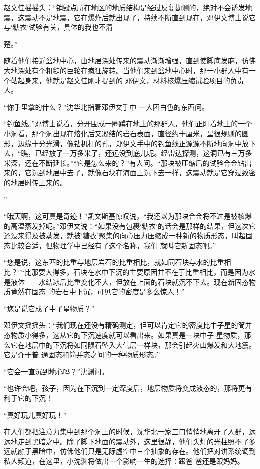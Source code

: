 \documentclass{article}
\begin{document}
赵文佳摇摇头：“销毁点所在地区的地质结构是经过反复勘测的，绝对不会诱发地震，这震动不是地震，它在爆炸后就出现了，持续不断直到现在，邓伊文博士说它与‘糖衣’试验有关，具体的我也不清

\newpage
楚。” 

随着他们接近盆地中心，由地层深处传来的震动渐渐增强，直到使脚底发麻，仿佛大地深处有个粗糙的巨轮在疯狂旋转。当他们来到盆地中心时，那一小群人中有一个站起身来，他就是赵文佳刚才提到的
邓伊文，材料核爆压缩试验项目的负责人。 

“你手里拿的什么？”沈华北指着邓伊文手中
一大团白色的东西问。 

“钓鱼线。”邓博士说着，分开围成一圈蹲在地上的那群人，他们正盯着地上的一个小洞看，那个洞出现在熔化后又凝结的岩石表面，直径约十厘米，呈很规则的圆形，边缘十分光滑，像钻机打的孔，郑伊文手中的钓鱼线正源源不断地向洞中放下去，“瞧，已经放了一万多米了，还远没到底儿呢。经雷达探测，这洞已有三万多米深，还在不断延长。”“它是怎么来的？”有人问。“那块被压缩后的试验合金钻出来的，它沉到地层中去了，就像石块在海面上沉下去一样，这震动就是它穿过致密的地层时传上来的。

\newpage
” 

“哦天啊，这可真是奇迹！”凯文斯基惊叹说，“我还以为那块合金将不过是被核爆的高温蒸发掉呢。”邓伊文说：“如果没有包裹‘糖衣’的话会是那样的结果，但这次它还没来得及被蒸发，就被‘糖衣’聚集的向心压力压缩成一种新的物质形态，叫超固态比较合适，但物理学中已经有了这个名称，我们
就叫它新固态吧。” 

“您是说，这东西的比重与地层岩石的比重相比，就如同石块与水的比重相比？”“比那要大得多，石块在水中下沉的主要原因并不在于比重相比，而是因为水是液体——水结冰后比重变化不大，但放在上面的石块就沉不下去。现在新固态物质竟然在固态
的岩石中下沉，可见它的密度是多么惊人！” 


“您是说它成了中子星物质？” 

邓伊文摇摇头：“我们现在还没有精确测定，但可以肯定它的密度比中子星的简并态物质小得多，这从它的下沉速度就可以看出来。如果真是一块中子
\newpage
星物质，那么它在地层中的下沉将如同陨石坠入大气层一样块，那会引起火山爆发和大地震。它是介于普
通固态和简并态之间的一种物质形态。” 


“它会一直沉到地心吗？”沈渊问。 

“也许会吧，孩子，因为在下沉到一定深度后，地层物质将变成液态的，那将更有利于它的下沉！


“真好玩儿真好玩！” 

在人们都把注意力集中到那个洞上的时候，沈华北一家三口悄悄地离开了人群，远远地走到黑暗之中。除了脚下地面的震动外，这里很静，他们头灯的光柱照不了多远就融于黑暗中，仿佛他们只是无际虚空中三个抽象的存在。他们把对讲系统调到私人频道，在这里，小沈渊将做出一个影响一生的选择：跟爸
爸还是跟妈妈。 
\end{document}
